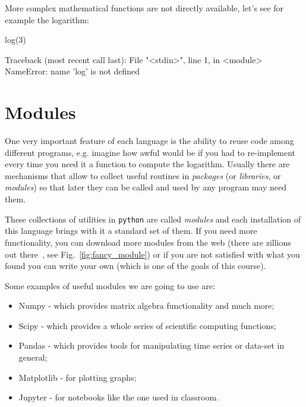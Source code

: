 More complex mathematical functions are not directly available, let's see for example the logarithm:

\begin{ipython}
log(3)
\end{ipython}
\begin{ioutput}
Traceback (most recent call last):
  File "<stdin>", line 1, in <module>
NameError: name 'log' is not defined
\end{ioutput}

\section{Modules}\label{modules}

One very important feature of each language is the ability to reuse code among different programs, e.g. imagine how awful would be if you had to re-implement every time you need it a function to compute the logarithm.
Usually there are mechanisms that allow to collect useful routines in \emph{packages} (or \emph{libraries}, or \emph{modules}) so that later they can be called and used by any program may need them.

These collections of utilities in \texttt{python} are called \emph{modules} and each installation of this language brings with it a standard set of them. If you need more functionality, you can download more modules from the web (there are zillions out there~\cite{modules}, see Fig.~\ref{fig:fancy_module}) or if you are not satisfied with what you found you can write your own (which is one of the goals of this course).

Some examples of useful modules we are going to use are:

\begin{itemize}
\tightlist
\item Numpy - which provides matrix algebra functionality and much more;
\item Scipy - which provides a whole series of scientific computing
  functions;
\item Pandas - which provides tools for manipulating time series or data-set
  in general;
\item Matplotlib - for plotting graphs;
\item Jupyter - for notebooks like the one used in classroom.
\end{itemize}

